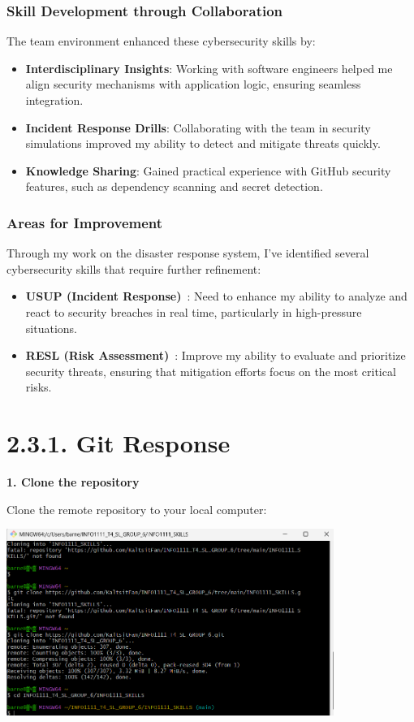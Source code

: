 \documentclass[a4paper, 11pt]{report}
\begin{document}
\subsubsection{Skill Development through Collaboration}
The team environment enhanced these cybersecurity skills by:
\begin{itemize}
    \item \textbf{Interdisciplinary Insights}: Working with software engineers helped me align security mechanisms with application logic, ensuring seamless integration.
    \item \textbf{Incident Response Drills}: Collaborating with the team in security simulations improved my ability to detect and mitigate threats quickly.
    \item \textbf{Knowledge Sharing}: Gained practical experience with GitHub security features, such as dependency scanning and secret detection.
\end{itemize}

\subsubsection{Areas for Improvement}  
Through my work on the disaster response system, I've identified several cybersecurity skills that require further refinement:
\begin{itemize}
    \item \textbf{USUP (Incident Response)}~\cite{incident_response}: Need to enhance my ability to analyze and react to security breaches in real time, particularly in high-pressure situations.
    \item \textbf{RESL (Risk Assessment)}~\cite{risk_assessment}: Improve my ability to evaluate and prioritize security threats, ensuring that mitigation efforts focus on the most critical risks.
\end{itemize}  

\newpage

\section*{2.3.1. Git Response}

\textbf{1. Clone the repository}

Clone the remote repository to your local computer:

\begin{center}
\includegraphics[width=0.8\textwidth]{BZ/1.png}
\end{center}
\end{document}

